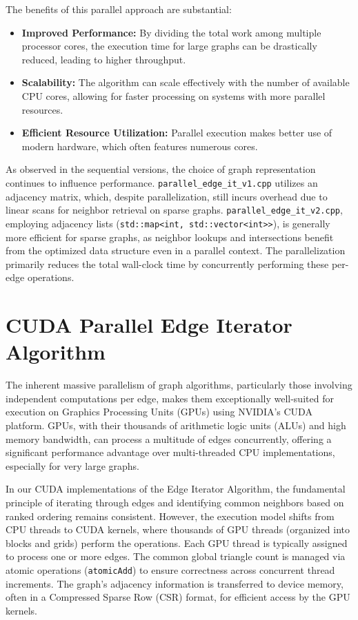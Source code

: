\documentclass{aes2e}
\begin{document}
The benefits of this parallel approach are substantial:
\begin{itemize}
    \item \textbf{Improved Performance:} By dividing the total work among multiple processor cores, the execution time for large graphs can be drastically reduced, leading to higher throughput.
    \item \textbf{Scalability:} The algorithm can scale effectively with the number of available CPU cores, allowing for faster processing on systems with more parallel resources.
    \item \textbf{Efficient Resource Utilization:} Parallel execution makes better use of modern hardware, which often features numerous cores.
\end{itemize}
As observed in the sequential versions, the choice of graph representation continues to influence performance. \texttt{parallel\_edge\_it\_v1.cpp} utilizes an adjacency matrix, which, despite parallelization, still incurs overhead due to linear scans for neighbor retrieval on sparse graphs. \texttt{parallel\_edge\_it\_v2.cpp}, employing adjacency lists (\texttt{std::map<int, std::vector<int>>}), is generally more efficient for sparse graphs, as neighbor lookups and intersections benefit from the optimized data structure even in a parallel context. The parallelization primarily reduces the total wall-clock time by concurrently performing these per-edge operations.


\section{CUDA Parallel Edge Iterator Algorithm}

The inherent massive parallelism of graph algorithms, particularly those involving independent computations per edge, makes them exceptionally well-suited for execution on Graphics Processing Units (GPUs) using NVIDIA's CUDA platform. GPUs, with their thousands of arithmetic logic units (ALUs) and high memory bandwidth, can process a multitude of edges concurrently, offering a significant performance advantage over multi-threaded CPU implementations, especially for very large graphs.

In our CUDA implementations of the Edge Iterator Algorithm, the fundamental principle of iterating through edges and identifying common neighbors based on ranked ordering remains consistent. However, the execution model shifts from CPU threads to CUDA kernels, where thousands of GPU threads (organized into blocks and grids) perform the operations. Each GPU thread is typically assigned to process one or more edges. The common global triangle count is managed via atomic operations (\texttt{atomicAdd}) to ensure correctness across concurrent thread increments. The graph's adjacency information is transferred to device memory, often in a Compressed Sparse Row (CSR) format, for efficient access by the GPU kernels.
\end{document}

